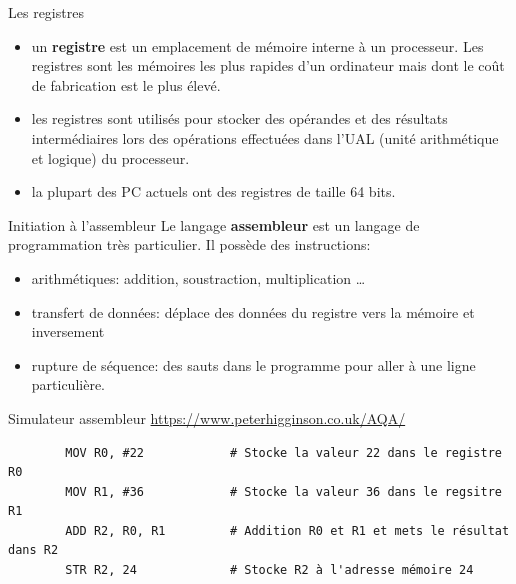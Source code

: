 \def\level{Première}  %
\def\course{NSI}
\def\chaptername{La langage assembleur} %
\def\docname{ARSE01-ACT1}        %

\pagestyle{cours_FP}
\makeheader{} %

\begin{easybox}{Les registres}{}

    \begin{itemize}
        \item un \textbf{registre} est un emplacement de mémoire interne à un processeur. Les registres sont les mémoires les plus rapides d'un ordinateur mais dont le coût de fabrication est le plus élevé.
        \item les registres sont utilisés pour stocker des opérandes et des résultats intermédiaires lors des opérations effectuées dans l'UAL (unité arithmétique et logique) du processeur.
        \item la plupart des PC actuels ont des registres de taille 64 bits.
    \end{itemize}

        
\end{easybox}


\begin{easybox}{Initiation à l'assembleur}{}
	Le langage \textbf{assembleur} est un langage de programmation très particulier. Il possède des instructions:
	\begin{itemize}
		\item arithmétiques: addition, soustraction, multiplication \ldots
		\item transfert de données: déplace des données du registre vers la mémoire et inversement
		\item rupture de séquence: des sauts dans le programme pour aller à une ligne particulière.
	\end{itemize}
\end{easybox}

\begin{easybox}{Simulateur assembleur}{}
	 \href{https://www.peterhigginson.co.uk/AQA/}{https://www.peterhigginson.co.uk/AQA/}
\end{easybox}



\begin{exemple}{}
	\begin{verbatim}
		MOV R0, #22            # Stocke la valeur 22 dans le registre R0
		MOV R1, #36            # Stocke la valeur 36 dans le regsitre R1
		ADD R2, R0, R1         # Addition R0 et R1 et mets le résultat dans R2
		STR R2, 24             # Stocke R2 à l'adresse mémoire 24
	\end{verbatim}
\end{exemple}


